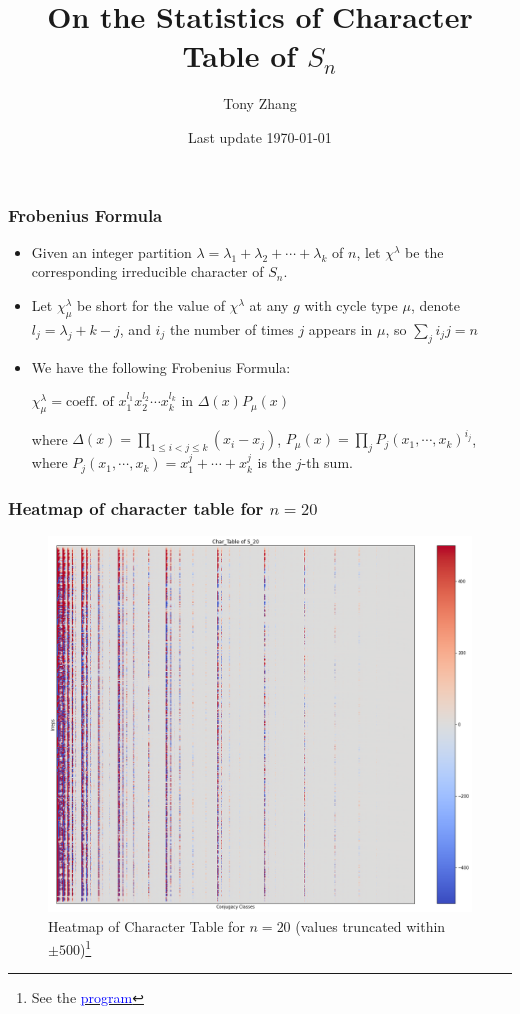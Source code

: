 \documentclass{beamer}
\title[University of Michigan LoG(M)]{On the Statistics of Character Table of $S_n$}
\author{Tony Zhang}
\institute{University of Michigan}
\date{Last update \today}
\begin{document}
\begin{frame}
\titlepage
\end{frame}

\begin{frame}
\frametitle{Frobenius Formula}
\begin{theorem} 
    \begin{itemize}
\item Given an integer partition $\lambda = \lambda_1 + \lambda_2 + \cdots + \lambda_k$ of $n$, let $\chi^{\lambda}$ be the corresponding irreducible character of $S_n$. 
\item Let $\chi^{\lambda}_{\mu}$ be short for the value of $\chi^{\lambda}$ at any $g$ with cycle type $\mu$, denote $l_j  =\lambda_j + k - j$, and $i_j$ the number of times $j$ appears in $\mu$, so $\sum\limits_j i_jj = n$
\item We have the following Frobenius Formula: 

 $\chi^{\lambda}_{\mu} = \text{coeff. of }  x_{1}^{l_1} x_{2}^{l_2}\cdots x_{k}^{l_k}$ in $\Delta(x) P_{\mu}(x)$
 
  
where $\Delta(x) = \prod\limits_{1 \leq i < j \leq k} (x_i-x_j)$, $P_\mu(x) = \prod\limits_j P_j(x_1,\cdots, x_k)^{i_j}$, where $P_j(x_1,\cdots, x_k) = x_1^j + \cdots + x_k^j$ is the $j$-th sum.
\end{itemize}
\end{theorem}
\end{frame}


\begin{frame}
\frametitle{Heatmap of character table for $n=20$}
\begin{figure}[H]
  \centering
  \includegraphics[width=0.6\linewidth]{char_table_20.png}
  \begin{center}
      \caption{\tiny Heatmap of Character Table for $n=20$ (values truncated within $\pm 500$)\footnote{ \tiny See the \href{https://github.com/TonyZhang2004/Character_Table_of_Symmetric_Groups/blob/main/char_table.ipynb}{\textcolor{blue}{program}}}}
  \end{center}
  
  \label{fig:char_20}
\end{figure}
\end{frame}
\end{document}
